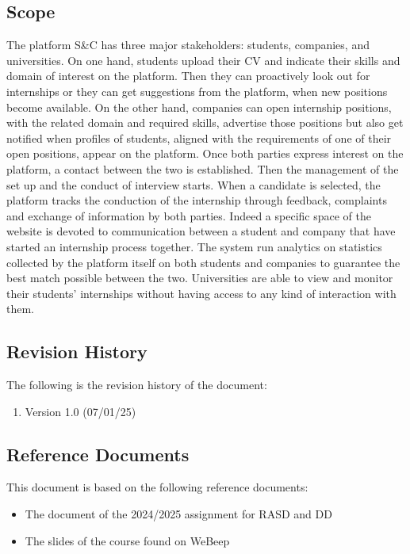 
\subsection{Scope}
    The platform S\&C has three major stakeholders: students, companies, and universities. On one hand, students upload their CV and indicate their skills and domain of interest on the platform. Then they can proactively look out for internships or they can get suggestions from the platform, when new positions become available. On the other hand, companies can open internship positions, with the related domain and required skills, advertise those positions but also get notified when profiles of students, aligned with the requirements of one of their open positions, appear on the platform.
    Once both parties express interest on the platform, a contact between the two is established. Then the management of the set up and the conduct of interview starts. When a candidate is selected, the platform tracks the conduction of the internship through feedback, complaints and exchange of information by both parties. Indeed a specific space of the website is devoted to communication between a student and company that have started an internship process together. The system run analytics on statistics collected by the platform itself on both students and companies to guarantee the best match possible between the two. Universities are able to view and monitor their students' internships without having access to any kind of interaction with them.


\subsection{Revision History}
The following is the revision history of the document:
\begin{enumerate}
    \item Version 1.0 (07/01/25)
\end{enumerate}

\subsection{Reference Documents}
    This document is based on the following reference documents:
    \begin{itemize}
        \item {The document of the 2024/2025 assignment for RASD and DD }
        \item {The slides of the course found on WeBeep}
    \end{itemize}

